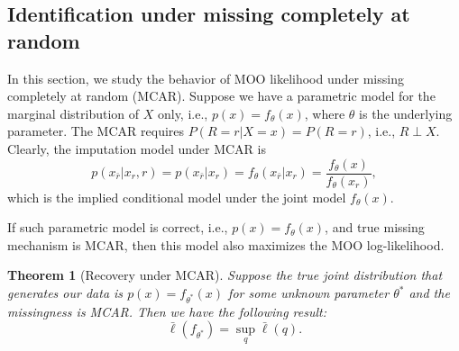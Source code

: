\documentclass[aos, preprint]{imsart}
\theoremstyle{plain}
\newtheorem{theorem}{Theorem}[section]
\theoremstyle{definition}
\begin{document}
\subsection{Identification under missing completely at random}


In this section, we  study the behavior of MOO likelihood under missing completely at random (MCAR). 
Suppose we have a parametric model for the marginal distribution of $X$ only, i.e., $p(x) =f_\theta(x)$,
where $\theta$ is the underlying parameter. 
The MCAR requires 
$P(R=r|X=x) = P(R=r)$, i.e., $R\perp X$.
Clearly, the imputation model under MCAR is
$$
p(x_{\bar r}|x_r, r)= p(x_{\bar r}|x_r) = f_\theta(x_{\bar r}|x_r) = \frac{f_\theta(x)}{f_{\theta}(x_r)},
$$
which is the implied conditional model under the joint model $f_\theta(x)$.



If such parametric model is correct, i.e., $p(x) = f_\theta(x)$, and true missing mechanism is MCAR, then this model also maximizes the MOO log-likelihood.
\begin{theorem}[Recovery under MCAR]
\label{thm::mcar}
Suppose the true joint distribution that generates our data is  $p(x) = f_{\theta^*}(x)$ for some unknown parameter $\theta^*$
and the missingness is MCAR. 
Then we have the following result:
$$
\bar \ell(f_{\theta^*}) = \sup_q \bar \ell(q).
$$
\end{theorem}
\end{document}
